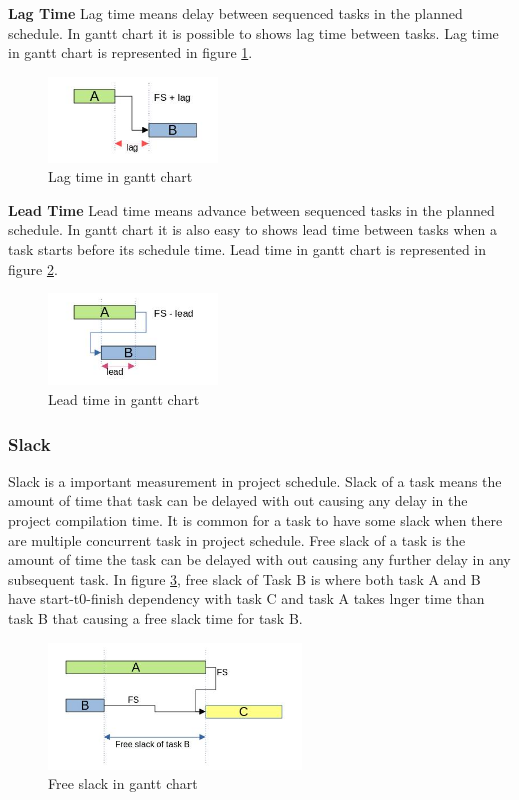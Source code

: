 \begin{spacing}{1}
\textbf{Lag Time}\newline
Lag time means delay between sequenced tasks in the planned schedule. In gantt chart it is possible to shows lag time between tasks. Lag time in gantt chart is represented in figure \ref{fig:lag}.
\begin{figure}[H]
	\centering
	\includegraphics[width=0.4\textwidth]{lag}
	\caption{Lag time in gantt chart}
	\label{fig:lag}
\end{figure} 

\textbf{Lead Time}\newline
Lead time means advance between sequenced tasks in the planned schedule. In gantt chart it is also easy to shows lead time between tasks when a task starts before its schedule time. Lead time in gantt chart is represented in figure \ref{fig:lead}.
\begin{figure}[H]
	\centering
	\includegraphics[width=0.4\textwidth]{lead}
	\caption{Lead time in gantt chart}
	\label{fig:lead}
\end{figure} 

\subsubsection{Slack}
Slack is a important measurement in project schedule. Slack of a task means the amount of time that task can be delayed with out causing any delay in the project compilation time. It is common for a task to have some slack when there are multiple concurrent task in project schedule. 
Free slack of a task is the amount of time the task can be delayed with out causing any further delay in any subsequent task. In figure \ref{fig:fslack}, free slack of Task B is where both task A and B have start-t0-finish dependency with task C and task A takes lnger time than task B that causing a free slack time for task B.
\begin{figure}[H]
	\centering
	\includegraphics[width=0.6\textwidth]{fslack}
	\caption{Free slack in gantt chart}
	\label{fig:fslack}
\end{figure} 


\end{spacing}
